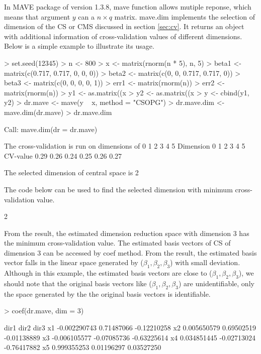 \documentclass{article}
\newcommand{\code}[1]{\normalfont\ttfamily\hyphenchar\font=-1 #1}
\begin{document}
In MAVE package of version 1.3.8, \code{mave} function allows mutiple reponse, which means that argument $y$ can a $n\times q$ matrix. \code{mave.dim} implements the selection of dimension of the CS or CMS discussed in section \ref{sec:cv}. It returns an object with additional information of cross-validation values of different dimensions. Below is a simple example to illustrate its usage.
\begin{Schunk}
\begin{Sinput}
> set.seed(12345)
> n <- 800
> x <- matrix(rnorm(n * 5), n, 5)
> beta1 <- matrix(c(0.717, 0.717, 0, 0, 0))
> beta2 <- matrix(c(0, 0, 0.717, 0.717, 0))
> beta3 <- matrix(c(0, 0, 0, 0, 1))
> err1 <- matrix(rnorm(n))
> err2 <- matrix(rnorm(n))
> y1 <- as.matrix((x %*% beta1) / (1 + 2 * (x %*% beta2)^2) + (x %*% beta3) * err1)
> y2 <- as.matrix((x %*% beta3)^2) + err2
> y <- cbind(y1, y2)
> dr.mave <- mave(y ~ x, method = "CSOPG")
> dr.mave.dim <- mave.dim(dr.mave)
> dr.mave.dim
\end{Sinput}
\begin{Soutput}
Call:
mave.dim(dr = dr.mave)

The cross-validation is run on dimensions of 0 1 2 3 4 5 
Dimension	0 	1 	2 	3 	4 	5 	
CV-value	0.29 	0.26 	0.24 	0.25 	0.26 	0.27 	

The selected dimension of  central space  is  2
\end{Soutput}
\end{Schunk}
The code below can be used to find the selected dimension with minimum cross-validation value.
\begin{Schunk}
\begin{Soutput}
[1] 2
\end{Soutput}
\end{Schunk}
From the result, the estimated dimension reduction space with dimension 3 has the minimum cross-validation value. The estimated basis vectors of CS of dimension 3 can be accessed by \code{coef} method. From the result, the estimated basis vector falls in the linear space generated by ($\beta_1,\beta_2,\beta_3$) with small deviation. Although in this example, the estimated basis vectors are close to ($\beta_1,\beta_2,\beta_3$), we should note that the original basis vectors like ($\beta_1,\beta_2,\beta_3$) are unidentifiable, only the space generated by the the original basis vectors is identifiable.
\begin{Schunk}
\begin{Sinput}
> coef(dr.mave, dim = 3)
\end{Sinput}
\begin{Soutput}
           dir1        dir2        dir3
x1 -0.002290743  0.71487066 -0.12210258
x2  0.005650579  0.69502519 -0.01138889
x3 -0.006105577 -0.07085736 -0.63225614
x4  0.034851445 -0.02713024 -0.76417882
x5  0.999355253  0.01196297  0.03527250
\end{Soutput}
\end{Schunk}
\end{document}
